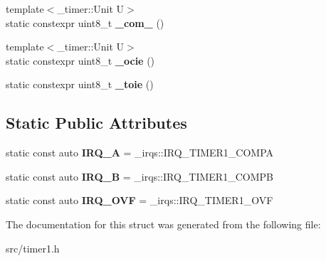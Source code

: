 \begin{DoxyCompactItemize}
\item 
{\footnotesize template$<$\+\_\+timer\+::\+Unit U$>$ }\\static constexpr uint8\+\_\+t {\bfseries \+\_\+com\+\_} ()\hypertarget{struct__timer1_1_1TimerDef_a36587d5c690dd8828938384b1c427052}{}\label{struct__timer1_1_1TimerDef_a36587d5c690dd8828938384b1c427052}

\item 
{\footnotesize template$<$\+\_\+timer\+::\+Unit U$>$ }\\static constexpr uint8\+\_\+t {\bfseries \+\_\+ocie} ()\hypertarget{struct__timer1_1_1TimerDef_a6504dd40640fb7ab7999227fbf03a789}{}\label{struct__timer1_1_1TimerDef_a6504dd40640fb7ab7999227fbf03a789}

\item 
static constexpr uint8\+\_\+t {\bfseries \+\_\+toie} ()\hypertarget{struct__timer1_1_1TimerDef_ae7a6b40362c9cc350a4a614c50616936}{}\label{struct__timer1_1_1TimerDef_ae7a6b40362c9cc350a4a614c50616936}

\end{DoxyCompactItemize}
\subsection*{Static Public Attributes}
\begin{DoxyCompactItemize}
\item 
static const auto {\bfseries I\+R\+Q\+\_\+A} = \+\_\+irqs\+::\+I\+R\+Q\+\_\+\+T\+I\+M\+E\+R1\+\_\+\+C\+O\+M\+PA\hypertarget{struct__timer1_1_1TimerDef_a027dfdb642b38869b98e5430bc9ee36a}{}\label{struct__timer1_1_1TimerDef_a027dfdb642b38869b98e5430bc9ee36a}

\item 
static const auto {\bfseries I\+R\+Q\+\_\+B} = \+\_\+irqs\+::\+I\+R\+Q\+\_\+\+T\+I\+M\+E\+R1\+\_\+\+C\+O\+M\+PB\hypertarget{struct__timer1_1_1TimerDef_ac72126667749d7df7fa83837b87c4fce}{}\label{struct__timer1_1_1TimerDef_ac72126667749d7df7fa83837b87c4fce}

\item 
static const auto {\bfseries I\+R\+Q\+\_\+\+O\+VF} = \+\_\+irqs\+::\+I\+R\+Q\+\_\+\+T\+I\+M\+E\+R1\+\_\+\+O\+VF\hypertarget{struct__timer1_1_1TimerDef_ab673f10cb12fc4bd91de978b837fe2b8}{}\label{struct__timer1_1_1TimerDef_ab673f10cb12fc4bd91de978b837fe2b8}

\end{DoxyCompactItemize}


The documentation for this struct was generated from the following file\+:\begin{DoxyCompactItemize}
\item 
src/timer1.\+h\end{DoxyCompactItemize}
